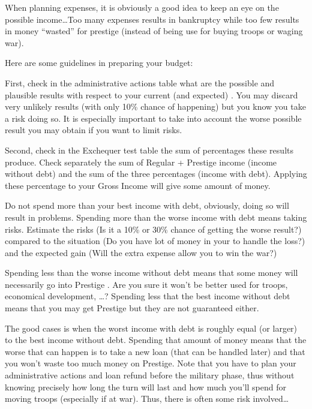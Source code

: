 \begin{playtip}
  When planning expenses, it is obviously a good idea to keep an eye on the
  possible income\ldots Too many expenses results in bankruptcy while too few
  results in money ``wasted'' for prestige (instead of being use for buying
  troops or waging war).

  Here are some guidelines in preparing your budget:

  First, check in the administrative actions table what are the possible and
  plausible results with respect to your current (and expected) \STAB. You may
  discard very unlikely results (with only 10\% chance of happening) but you
  know you take a risk doing so. It is especially important to take into
  account the worse possible result you may obtain if you want to limit risks.

  Second, check in the Exchequer test table the sum of percentages these
  results produce. Check separately the sum of Regular + Prestige income
  (income without debt) and the sum of the three percentages (income with
  debt). Applying these percentage to your Gross Income will give some amount
  of money.

  Do not spend more than your best income with debt, obviously, doing so
  will result in problems. Spending more than the worse income with debt means
  taking risks. Estimate the risks (Is it a 10\% or 30\% chance of getting the
  worse result?) compared to the situation (Do you have lot of money in your
  \RT to handle the loss?) and the expected gain (Will the extra expense allow
  you to win the war?)

  Spending less than the worse income without debt means that some money will
  necessarily go into Prestige \VPs. Are you sure it won't be better used for
  troops, economical development, \ldots? Spending less that the best income
  without debt means that you may get Prestige \VPs but they are not
  guaranteed either.

  The good cases is when the worst income with debt is roughly equal (or
  larger) to the best income without debt. Spending that amount of money means
  that the worse that can happen is to take a new loan (that can be handled
  later) and that you won't waste too much money on Prestige. Note that you
  have to plan your administrative actions and loan refund before the military
  phase, thus without knowing precisely how long the turn will last and how
  much you'll spend for moving troops (especially if at war). Thus, there is
  often some risk involved\ldots


\end{playtip}
